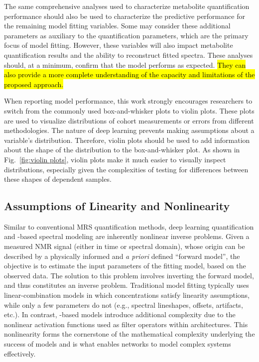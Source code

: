 The same comprehensive analyses used to characterize metabolite quantification performance should also be used to characterize the predictive performance for the remaining model fitting variables. Some may consider these additional parameters as auxiliary to the quantification parameters, which are the primary focus of model fitting. However, these variables will also impact metabolite quantification results and the ability to reconstruct fitted spectra. These analyses should, at a minimum, confirm that the model performs as expected. \hl{They can also provide a more complete understanding of the capacity and limitations of the proposed approach.}

When reporting model performance, this work strongly encourages researchers to switch from the commonly used box-and-whisker plots to violin plots. These plots are used to visualize distributions of cohort measurements or errors from different methodologies. The nature of deep learning prevents making assumptions about a variable’s distribution. Therefore, violin plots should be used to add information about the shape of the distribution to the box-and-whisker plot. As shown in Fig.~\ref{fig:violin plots}, violin plots make it much easier to visually inspect distributions, especially given the complexities of testing for differences between these shapes of dependent samples.

\subsection{Assumptions of Linearity and Nonlinearity}
\label{sec: assumptions}
Similar to conventional MRS quantification methods, deep learning quantification and \DL-based spectral modeling are inherently nonlinear inverse problems. Given a measured NMR signal (either in time or spectral domain), whose origin can be described by a physically informed and \textit{a priori} defined “forward model”, the objective is to estimate the input parameters of the fitting model, based on the observed data. The solution to this problem involves inverting the forward model, and thus constitutes an inverse problem. Traditional model fitting typically uses linear-combination models in which concentrations satisfy linearity assumptions, while only a few parameters do not (e.g., spectral lineshapes, offsets, artifacts, etc.). In contrast, \DL-based models introduce additional complexity due to the nonlinear activation functions used as filter operators within \DL architectures. This nonlinearity forms the cornerstone of the mathematical complexity underlying the success of \DL models and is what enables \DL networks to model complex systems effectively.

